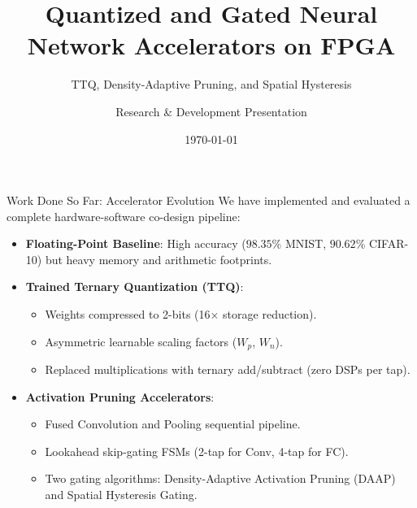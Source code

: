 \documentclass{beamer}
\title[FPGA NN Exploration]{Quantized and Gated Neural Network Accelerators on FPGA}
\subtitle{TTQ, Density-Adaptive Pruning, and Spatial Hysteresis}
\author{Research & Development Presentation}
\date{\today}
\begin{document}
\begin{frame}
\titlepage
\end{frame}

\begin{frame}{Work Done So Far: Accelerator Evolution}
We have implemented and evaluated a complete hardware-software co-design pipeline:
\begin{itemize}
    \item \textbf{Floating-Point Baseline}: High accuracy ($98.35\%$ MNIST, $90.62\%$ CIFAR-10) but heavy memory and arithmetic footprints.
    \item \textbf{Trained Ternary Quantization (TTQ)}:
    \begin{itemize}
        \item Weights compressed to 2-bits (16$\times$ storage reduction).
        \item Asymmetric learnable scaling factors ($W_p$, $W_n$).
        \item Replaced multiplications with ternary add/subtract (zero DSPs per tap).
    \end{itemize}
    \item \textbf{Activation Pruning Accelerators}:
    \begin{itemize}
        \item Fused Convolution and Pooling sequential pipeline.
        \item Lookahead skip-gating FSMs (2-tap for Conv, 4-tap for FC).
        \item Two gating algorithms: Density-Adaptive Activation Pruning (DAAP) and Spatial Hysteresis Gating.
    \end{itemize}
\end{itemize}
\end{frame}
\end{document}

